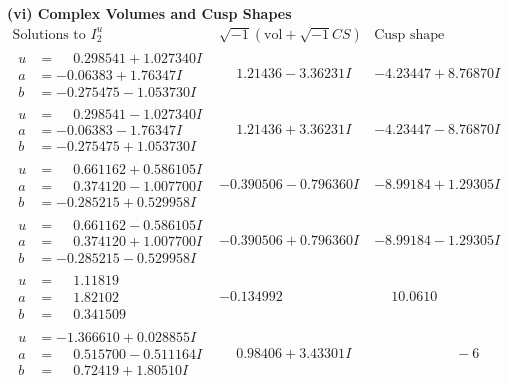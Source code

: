 \documentclass[1p]{elsarticle_modified}
\theoremstyle{definition}
\newcommand{\I}{\sqrt{-1}}
\begin{document}
\newpage\flushleft \textbf{(vi) Complex Volumes and Cusp Shapes}
$$\begin{array}{c|c|c}  
\text{Solutions to }I^u_{2}& \I (\text{vol} + \sqrt{-1}CS) & \text{Cusp shape}\\
 \hline 
\begin{aligned}
u &= \phantom{-}0.298541 + 1.027340 I \\
a &= -0.06383 + 1.76347 I \\
b &= -0.275475 - 1.053730 I\end{aligned}
 & \phantom{-}1.21436 - 3.36231 I & -4.23447 + 8.76870 I \\ \hline\begin{aligned}
u &= \phantom{-}0.298541 - 1.027340 I \\
a &= -0.06383 - 1.76347 I \\
b &= -0.275475 + 1.053730 I\end{aligned}
 & \phantom{-}1.21436 + 3.36231 I & -4.23447 - 8.76870 I \\ \hline\begin{aligned}
u &= \phantom{-}0.661162 + 0.586105 I \\
a &= \phantom{-}0.374120 - 1.007700 I \\
b &= -0.285215 + 0.529958 I\end{aligned}
 & -0.390506 - 0.796360 I & -8.99184 + 1.29305 I \\ \hline\begin{aligned}
u &= \phantom{-}0.661162 - 0.586105 I \\
a &= \phantom{-}0.374120 + 1.007700 I \\
b &= -0.285215 - 0.529958 I\end{aligned}
 & -0.390506 + 0.796360 I & -8.99184 - 1.29305 I \\ \hline\begin{aligned}
u &= \phantom{-}1.11819\phantom{ +0.000000I} \\
a &= \phantom{-}1.82102\phantom{ +0.000000I} \\
b &= \phantom{-}0.341509\phantom{ +0.000000I}\end{aligned}
 & -0.134992\phantom{ +0.000000I} & \phantom{-}10.0610\phantom{ +0.000000I} \\ \hline\begin{aligned}
u &= -1.366610 + 0.028855 I \\
a &= \phantom{-}0.515700 - 0.511164 I \\
b &= \phantom{-}0.72419 + 1.80510 I\end{aligned}
 & \phantom{-}0.98406 + 3.43301 I & \phantom{-0.000000 -}     -6

\end{array}$$
\end{document}
